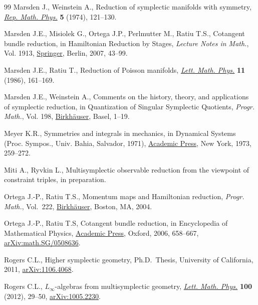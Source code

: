 \begin{thebibliography}{99}
Marsden J., Weinstein A., Reduction of symplectic manifolds with symmetry,
  \href{https://doi.org/10.1016/0034-4877(74)90021-4}{\textit{Rep. Math. Phys.}} \textbf{5} (1974), 121--130.

Marsden J.E., Misiolek G., Ortega J.P., Perlmutter M., Ratiu T.S., Cotangent
  bundle reduction, in Hamiltonian Reduction by Stages, \textit{Lecture Notes
  in Math.}, Vol. 1913, \href{https://doi.org/10.1007/978-3-540-72470-4_2}{Springer}, Berlin, 2007, 43--99.

Marsden J.E., Ratiu T., Reduction of {P}oisson manifolds, \href{https://doi.org/10.1007/BF00398428}{\textit{Lett. Math.
  Phys.}} \textbf{11} (1986), 161--169.

Marsden J.E., Weinstein A., Comments on the history, theory, and applications
  of symplectic reduction, in Quantization of Singular Symplectic Quotients,
  \textit{Progr. Math.}, Vol. 198, \href{https://doi.org/10.1007/978-3-0348-8364-1_1}{Birkh\"auser}, Basel, 1--19.

Meyer K.R., Symmetries and integrals in mechanics, in Dynamical Systems
  ({P}roc. {S}ympos., {U}niv. {B}ahia, {S}alvador, 1971), \href{https://doi.org/10.1016/B978-0-12-550350-1.50025-4}{Academic Press}, New
  York, 1973, 259--272.

Miti A., Ryvkin L., Multisymplectic observable reduction from the viewpoint of
  constraint triples, in preparation.

Ortega J.-P., Ratiu T.S., Momentum maps and {H}amiltonian reduction,
  \textit{Progr. Math.}, Vol.~222, \href{https://doi.org/10.1007/978-1-4757-3811-7}{Birkh\"auser}, Boston, MA, 2004.

Ortega J.-P., Ratiu T.S, Cotangent bundle reduction, in Encyclopedia of
  Mathematical Physics, \href{https://doi.org/10.1016/B0-12-512666-2/00501-0}{Academic Press}, Oxford, 2006, 658--667,
  \href{https://arxiv.org/abs/math.SG/0508636}{arXiv:math.SG/0508636}.

Rogers C.L., Higher symplectic geometry, Ph.D.~Thesis, {U}niversity of
  {C}alifornia, 2011, \href{https://arxiv.org/abs/1106.4068}{arXiv:1106.4068}.

Rogers C.L., $L_\infty$-algebras from multisymplectic geometry, \href{https://doi.org/10.1007/s11005-011-0493-x}{\textit{Lett.
  Math. Phys.}} \textbf{100} (2012), 29--50, \href{https://arxiv.org/abs/1005.2230}{arXiv:1005.2230}.


\end{thebibliography}

